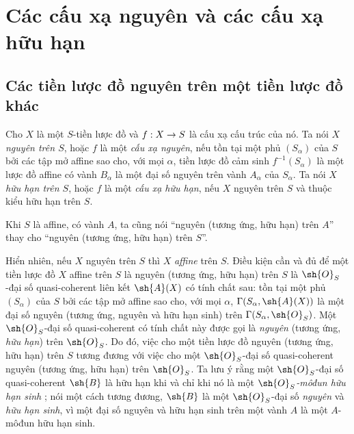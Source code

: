 \documentclass[oneside,10pt]{amsart}
\makeatletter
\newcommand{\ega@arrow}[2]{\mathchoice{#1}{#2}{#2}{#2}}
\renewcommand{\to}{\ega@arrow{\longrightarrow}{\rightarrow}}
\let\EGAOriginalLabel\label
\renewcommand{\label}[1]{\phantomsection\EGAOriginalLabel{#1}}
\makeatother
\begin{document}
\section{Các cấu xạ nguyên và các cấu xạ hữu hạn}
\label{section:II.6}

\subsection{Các tiền lược đồ nguyên trên một tiền lược đồ khác}
\label{subsection:II.6.1}

\begin{definition}[6.1.1]
\label{II.6.1.1}
Cho $X$ là một $S$-tiền lược đồ và $f:X\to S$ là cấu xạ cấu trúc của nó.
Ta nói $X$ \emph{nguyên trên $S$}, hoặc $f$ là một \emph{cấu xạ nguyên}, nếu tồn tại một phủ $(S_\alpha)$ của $S$ bởi các tập mở affine sao cho, với mọi $\alpha$, tiền lược đồ cảm sinh $f^{-1}(S_\alpha)$ là một lược đồ affine có vành $B_\alpha$ là một đại số nguyên trên vành $A_\alpha$ của $S_\alpha$.
Ta nói $X$ \emph{hữu hạn trên $S$}, hoặc $f$ là một \emph{cấu xạ hữu hạn}, nếu $X$ nguyên trên $S$ và thuộc kiểu hữu hạn trên $S$.
\end{definition}

Khi $S$ là affine, có vành $A$, ta cũng nói ``nguyên (tương ứng, hữu hạn) trên $A$'' thay cho ``nguyên (tương ứng, hữu hạn) trên $S$''.

\begin{env}[6.1.2]
\label{II.6.1.2}
Hiển nhiên, nếu $X$ nguyên trên $S$ thì $X$ \emph{affine} trên $S$.
Điều kiện cần và đủ để một tiền lược đồ $X$ affine trên $S$ là nguyên (tương ứng, hữu hạn) trên $S$ là $\sh{O}_S$-đại số quasi-coherent liên kết $\sh{A}(X)$ có tính chất sau: tồn tại một phủ $(S_\alpha)$ của $S$ bởi các tập mở affine sao cho, với mọi $\alpha$, $\Gamma(S_\alpha,\sh{A}(X))$ là một đại số nguyên (tương ứng, nguyên và hữu hạn sinh) trên $\Gamma(S_\alpha,\sh{O}_S)$.
Một $\sh{O}_S$-đại số quasi-coherent có tính chất này được gọi là \emph{nguyên} (tương ứng, \emph{hữu hạn}) trên $\sh{O}_S$.
Do đó, việc cho một tiền lược đồ nguyên (tương ứng, hữu hạn) trên $S$ tương đương  với việc cho một $\sh{O}_S$-đại số quasi-coherent nguyên (tương ứng, hữu hạn) trên $\sh{O}_S$.
Ta lưu ý rằng một $\sh{O}_S$-đại số quasi-coherent $\sh{B}$ là hữu hạn khi và chỉ khi nó là một \emph{$\sh{O}_S$-môđun hữu hạn sinh} ;
nói một cách tương đương, $\sh{B}$ là một $\sh{O}_S$-đại số \emph{nguyên} và \emph{hữu hạn sinh}, vì một đại số nguyên và hữu hạn sinh trên một vành $A$ là một $A$-môđun hữu hạn sinh.
\end{env}
\end{document}
